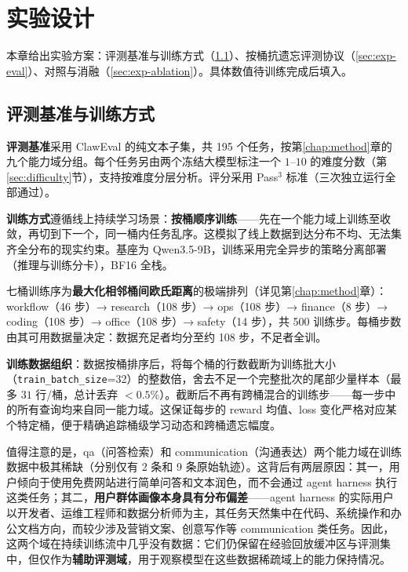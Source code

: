 \chapter{实验设计}
\label{chap:exp}

本章给出实验方案：评测基准与训练方式（\ref{sec:exp-setup}）、按桶抗遗忘评测协议（\ref{sec:exp-eval}）、对照与消融（\ref{sec:exp-ablation}）。具体数值待训练完成后填入。

\section{评测基准与训练方式}
\label{sec:exp-setup}

\textbf{评测基准}采用 ClawEval 的纯文本子集，共 195 个任务，按第\ref{chap:method}章的九个能力域分组。每个任务另由两个冻结大模型标注一个 $1$--$10$ 的难度分数（第\ref{sec:difficulty}节），支持按难度分层分析。评分采用 Pass$^3$ 标准（三次独立运行全部通过）。

\textbf{训练方式}遵循线上持续学习场景：\textbf{按桶顺序训练}——先在一个能力域上训练至收敛，再切到下一个，同一桶内任务乱序。这模拟了线上数据到达分布不均、无法集齐全分布的现实约束。基座为 Qwen3.5-9B，训练采用完全异步的策略分离部署（推理与训练分卡），BF16 全栈。

七桶训练序为\textbf{最大化相邻桶间欧氏距离}的极端排列（详见第\ref{chap:method}章）：workflow（46 步）→ research（108 步）→ ops（108 步）→ finance（8 步）→ coding（108 步）→ office（108 步）→ safety（14 步），共 500 训练步。每桶步数由其可用数据量决定：数据充足者均分至约 108 步，不足者全训。

\textbf{训练数据组织}：数据按桶排序后，将每个桶的行数截断为训练批大小（\texttt{train\_batch\_size}=32）的整数倍，舍去不足一个完整批次的尾部少量样本（最多 $31$ 行/桶，总计丢弃 $<0.5\%$）。截断后不再有跨桶混合的训练步——每一步中的所有查询均来自同一能力域。这保证每步的 reward 均值、loss 变化严格对应某个特定桶，便于精确追踪桶级学习动态和跨桶遗忘幅度。

值得注意的是，qa（问答检索）和 communication（沟通表达）两个能力域在训练数据中极其稀缺（分别仅有 2 条和 9 条原始轨迹）。这背后有两层原因：其一，用户倾向于使用免费网站进行简单问答和文本润色，而不会通过 agent harness 执行这类任务；其二，\textbf{用户群体画像本身具有分布偏差}——agent harness 的实际用户以开发者、运维工程师和数据分析师为主，其任务天然集中在代码、系统操作和办公文档方向，而较少涉及营销文案、创意写作等 communication 类任务。因此，这两个域在持续训练流中几乎没有数据：它们仍保留在经验回放缓冲区与评测集中，但仅作为\textbf{辅助评测域}，用于观察模型在这些数据稀疏域上的能力保持情况。

